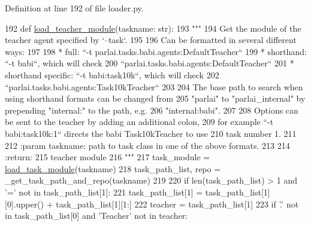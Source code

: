 Definition at line 192 of file loader.\+py.


\begin{DoxyCode}
192 \textcolor{keyword}{def }\hyperlink{namespaceparlai_1_1core_1_1loader_a9eed9fa0f15170da9d4de24c2c3d4e2a}{load\_teacher\_module}(taskname: str):
193     \textcolor{stringliteral}{"""}
194 \textcolor{stringliteral}{    Get the module of the teacher agent specified by `--task`.}
195 \textcolor{stringliteral}{}
196 \textcolor{stringliteral}{    Can be formatted in several different ways:}
197 \textcolor{stringliteral}{}
198 \textcolor{stringliteral}{    * full: ``-t parlai.tasks.babi.agents:DefaultTeacher``}
199 \textcolor{stringliteral}{    * shorthand: ``-t babi``, which will check}
200 \textcolor{stringliteral}{        ``parlai.tasks.babi.agents:DefaultTeacher``}
201 \textcolor{stringliteral}{    * shorthand specific: ``-t babi:task10k``, which will check}
202 \textcolor{stringliteral}{        ``parlai.tasks.babi.agents:Task10kTeacher``}
203 \textcolor{stringliteral}{}
204 \textcolor{stringliteral}{    The base path to search when using shorthand formats can be changed from}
205 \textcolor{stringliteral}{    "parlai" to "parlai\_internal" by prepending "internal:" to the path, e.g.}
206 \textcolor{stringliteral}{    "internal:babi".}
207 \textcolor{stringliteral}{}
208 \textcolor{stringliteral}{    Options can be sent to the teacher by adding an additional colon,}
209 \textcolor{stringliteral}{    for example ``-t babi:task10k:1`` directs the babi Task10kTeacher to use}
210 \textcolor{stringliteral}{    task number 1.}
211 \textcolor{stringliteral}{}
212 \textcolor{stringliteral}{    :param taskname: path to task class in one of the above formats.}
213 \textcolor{stringliteral}{}
214 \textcolor{stringliteral}{    :return:}
215 \textcolor{stringliteral}{        teacher module}
216 \textcolor{stringliteral}{    """}
217     task\_module = \hyperlink{namespaceparlai_1_1core_1_1loader_a7ae3c6abd5c669634eb8940902735fc4}{load\_task\_module}(taskname)
218     task\_path\_list, repo = \_get\_task\_path\_and\_repo(taskname)
219 
220     \textcolor{keywordflow}{if} len(task\_path\_list) > 1 \textcolor{keywordflow}{and} \textcolor{stringliteral}{'='} \textcolor{keywordflow}{not} \textcolor{keywordflow}{in} task\_path\_list[1]:
221         task\_path\_list[1] = task\_path\_list[1][0].upper() + task\_path\_list[1][1:]
222         teacher = task\_path\_list[1]
223         \textcolor{keywordflow}{if} \textcolor{stringliteral}{'.'} \textcolor{keywordflow}{not} \textcolor{keywordflow}{in} task\_path\_list[0] \textcolor{keywordflow}{and} \textcolor{stringliteral}{'Teacher'} \textcolor{keywordflow}{not} \textcolor{keywordflow}{in} teacher:

\end{DoxyCode}
